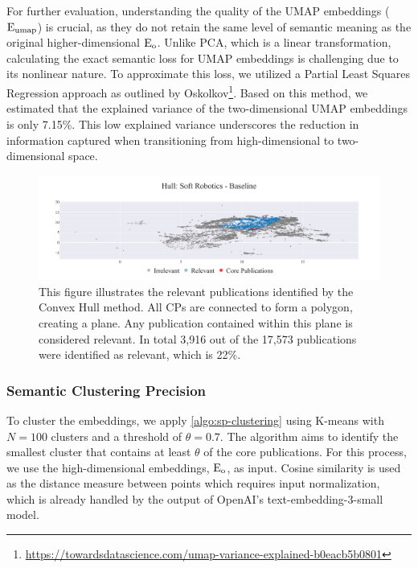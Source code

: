 For further evaluation, understanding the quality of the UMAP embeddings ($\mathop{}\!\mathrm{E_{umap}}$) is crucial, as they do not retain the same level of semantic meaning as the original higher-dimensional $\mathop{}\!\mathrm{E_{o}}$. Unlike PCA, which is a linear transformation, calculating the exact semantic loss for UMAP embeddings is challenging due to its nonlinear nature. To approximate this loss, we utilized a Partial Least Squares Regression approach as outlined by Oskolkov\footnote{\url{https://towardsdatascience.com/umap-variance-explained-b0eacb5b0801}}. Based on this method, we estimated that the explained variance of the two-dimensional UMAP embeddings is only 7.15\%. This low explained variance underscores the reduction in information captured when transitioning from high-dimensional to two-dimensional space.



\begin{figure}[!hb]
	\hspace*{-1cm}	
	\includegraphics[scale=0.45]{pics/sr-hull-baseline.pdf}
	\caption[Semantic Cosine Threshold: Empirical Analysis]{This figure illustrates the relevant publications identified by the Convex Hull method. All CPs are connected to form a polygon, creating a plane. Any publication contained within this plane is considered relevant. In total 3,916 out of the 17,573 publications were identified as relevant, which is 22\%.}\label{fig:sr-hull-baseline}  
\end{figure}


\subsubsection{Semantic Clustering Precision}

To cluster the embeddings, we apply \autoref{algo:sp-clustering} using K-means with \( N = 100 \) clusters and a threshold of \( \theta = 0.7 \). The algorithm aims to identify the smallest cluster that contains at least $\theta$ of the core publications. For this process, we use the high-dimensional embeddings, $\mathop{}\!\mathrm{E_{o}}$, as input. Cosine similarity is used as the distance measure between points which requires input normalization, which is already handled by the output of OpenAI's text-embedding-3-small model.

